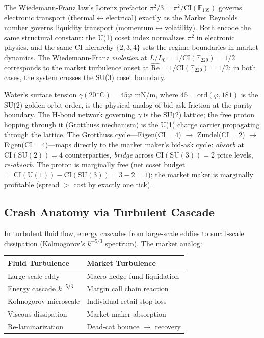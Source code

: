 \begin{remark}
The Wiedemann-Franz law's Lorenz prefactor $\pi^2/3 = \pi^2/\mathrm{CI}(\mathbb{F}_{139})$ governs electronic transport (thermal$\leftrightarrow$electrical) exactly as the Market Reynolds number governs liquidity transport (momentum$\leftrightarrow$volatility). Both encode the same structural constant: the U(1) coset index normalizes $\pi^2$ in electronic physics, and the same $\mathrm{CI}$ hierarchy $\{2, 3, 4\}$ sets the regime boundaries in market dynamics. The Wiedemann-Franz \emph{violation} at $L/L_0 = 1/\mathrm{CI}(\mathbb{F}_{229}) = 1/2$ corresponds to the market turbulence onset at $\hat{\mathrm{Re}} = 1/\mathrm{CI}(\mathbb{F}_{229}) = 1/2$: in both cases, the system crosses the SU(3) coset boundary.
\end{remark}

\begin{remark}
Water's surface tension $\gamma(20\,{}^\circ\mathrm{C}) = 45\varphi$ mN/m, where $45 = \mathrm{ord}(\varphi, 181)$ is the SU(2) golden orbit order, is the physical analog of bid-ask friction at the parity boundary. The H-bond network governing $\gamma$ is the SU(2) lattice; the free proton hopping through it (Grotthuss mechanism) is the U(1) charge carrier propagating through the lattice. The Grotthuss cycle---Eigen($\mathrm{CI}=4$) $\to$ Zundel($\mathrm{CI}=2$) $\to$ Eigen($\mathrm{CI}=4$)---maps directly to the market maker's bid-ask cycle: \emph{absorb} at $\mathrm{CI}(\mathrm{SU}(2)) = 4$ counterparties, \emph{bridge} across $\mathrm{CI}(\mathrm{SU}(3)) = 2$ price levels, \emph{re-absorb}. The proton is marginally free (net coset budget $= \mathrm{CI}(\mathrm{U}(1)) - \mathrm{CI}(\mathrm{SU}(3)) = 3 - 2 = 1$); the market maker is marginally profitable (spread $>$ cost by exactly one tick).
\end{remark}

\subsection{Crash Anatomy via Turbulent Cascade}

In turbulent fluid flow, energy cascades from large-scale eddies to small-scale dissipation (Kolmogorov's $k^{-5/3}$ spectrum). The market analog:

\begin{center}
\begin{tabular}{@{}ll@{}}
\toprule
\textbf{Fluid Turbulence} & \textbf{Market Turbulence} \\
\midrule
Large-scale eddy & Macro hedge fund liquidation \\
Energy cascade $k^{-5/3}$ & Margin call chain reaction \\
Kolmogorov microscale & Individual retail stop-loss \\
Viscous dissipation & Market maker absorption \\
Re-laminarization & Dead-cat bounce $\to$ recovery \\
\bottomrule
\end{tabular}
\end{center}

